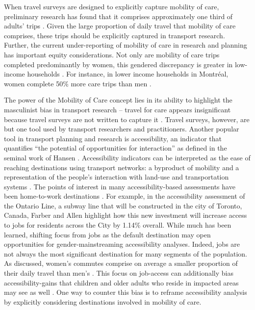 \documentclass[
  authoryear,
  preprint,
  3p]{elsarticle}
\begin{document}
When travel surveys are designed to explicitly capture mobility of care,
preliminary research has found that it comprises approximately one third
of adults' trips
\citep{gomezvaroAccountingCareEveryday2023, sanchezdemadariagaMobilityCareIntroducing2013, sanchezdemadariagaMeasuringMobilitiesCare2019, ravensbergenExploratoryAnalysisMobility2022}.
Given the large proportion of daily travel that mobility of care
comprises, these trips should be explicitly captured in transport
research. Further, the current under-reporting of mobility of care in
research and planning has important equity considerations. Not only are
mobility of care trips completed predominantly by women, this gendered
discrepancy is greater in low-income households
\citep{murillomunarCaregiversMoveGender2023, sanchezdemadariagaMobilityCareIntroducing2013, ravensbergenExploratoryAnalysisMobility2022}.
For instance, in lower income households in Montréal, women complete
50\% more care trips than men
\citep{ravensbergenExploratoryAnalysisMobility2022}.

The power of the Mobility of Care concept lies in its ability to
highlight the masculinist bias in transport research -- travel for care
appears insignificant because travel surveys are not written to capture
it \citep{sanchezdemadariagaMobilityCareIntroducing2013}. Travel
surveys, however, are but one tool used by transport researchers and
practitioners. Another popular tool in transport planning and research
is accessibility, an indicator that quantifies ``the potential of
opportunities for interaction'' as defined in the seminal work of Hansen
\citep{hansenHowAccessibilityShapes1959}. Accessibility indicators can
be interpreted as the ease of reaching destinations using transport
networks: a byproduct of mobility and a representation of the people's
interaction with land-use and transportation systems
\citep{hansenHowAccessibilityShapes1959, handyAccessibilityIdeaWhose2020, elgeneidyMakingAccessibilityWork2021}.
The points of interest in many accessibility-based assessments have been
home-to-work destinations
\citep{kelobonyeRelativeAccessibilityAnalysis2019, farberOntarioLineSocioeconomic2019, duarteInfluenceJobAccessibility2023, ryanAccessibilitySpaceTime2023}.
For example, in the accessibility assessment of the Ontario Line, a
subway line that will be constructed in the city of Toronto, Canada,
Farber and Allen \citep{farberOntarioLineSocioeconomic2019} highlight
how this new investment will increase access to jobs for residents
across the City by 1.14\% overall. While much has been learned, shifting
focus from jobs as the default destination may open opportunities for
gender-mainstreaming accessibility analyses. Indeed, jobs are not always
the most significant destination for many segments of the population. As
discussed, women's commutes comprise on average a smaller proportion of
their daily travel than men's
\citep{ravensbergenExploratoryAnalysisMobility2022}. This focus on
job-access can additionally bias accessibility-gains that children and
older adults who reside in impacted areas may see as well
\citep{grantsmithManagingChallengesCombining2016}. One way to counter
this bias is to reframe accessibility analysis by explicitly considering
destinations involved in mobility of care.
\end{document}

